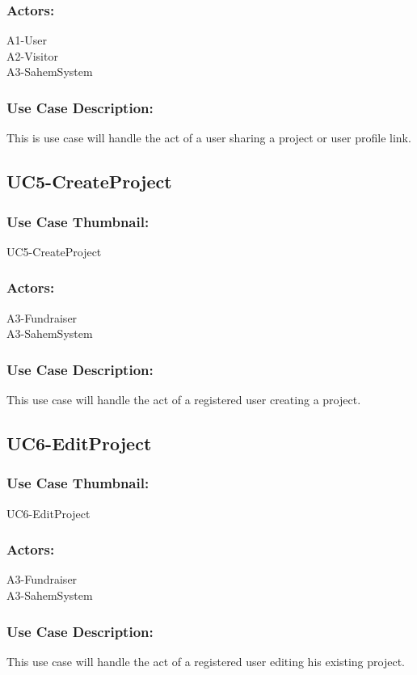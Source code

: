 \documentclass[11pt, openany]{report}
\begin{document}
\subsubsection*{Actors:}
A1-User\\
A2-Visitor\\
A3-SahemSystem
\subsubsection*{Use Case Description:}
This is use case will handle the act of a user sharing a project or user profile link.

\subsection{UC5-CreateProject}
\label{sUC5}
\subsubsection*{Use Case Thumbnail:}
UC5-CreateProject
\subsubsection*{Actors:}
A3-Fundraiser\\
A3-SahemSystem

\subsubsection*{Use Case Description:}
This use case will handle the act of a registered user creating a project.

\subsection{UC6-EditProject}
\label{sUC6}
\subsubsection*{Use Case Thumbnail:}
UC6-EditProject
\subsubsection*{Actors:}
A3-Fundraiser\\
A3-SahemSystem

\subsubsection*{Use Case Description:}
This use case will handle the act of a registered user editing his existing project.
\end{document}
